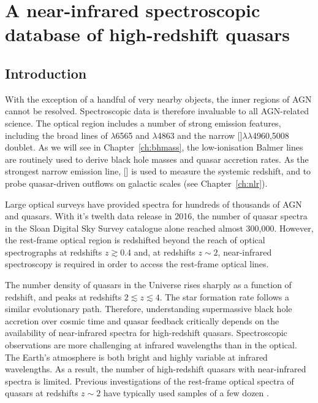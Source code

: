 
\chapter{A near-infrared spectroscopic database of high-redshift quasars}
\label{ch:chapter02}

\section{Introduction}

With the exception of a handful of very nearby objects, the inner regions of AGN cannot be resolved. 
Spectroscopic data is therefore invaluable to all AGN-related science. 
The optical region includes a number of strong emission features, including the broad lines of \hans$\lambda$6565 and \hbns$\lambda$4863 and the narrow []$\lambda\lambda$4960,5008 doublet. 
As we will see in Chapter~\ref{ch:bhmass}, the low-ionisation Balmer lines are routinely used to derive black hole masses and quasar accretion rates. 
As the strongest narrow emission line, [] is used to measure the systemic redshift, and to probe quasar-driven outflows on galactic scales (see Chapter~\ref{ch:nlr}). 

Large optical surveys have provided spectra for hundreds of thousands of AGN and quasars. 
With it's twelth data release in 2016, the number of quasar spectra in the Sloan Digital Sky Survey \citep[SDSS;][]{york00} catalogue alone reached almost 300,000. 
However, the rest-frame optical region is redshifted beyond the reach of optical spectrographs at redshifts $z \gtrsim$0.4 and, at redshifts $z\sim2$, near-infrared spectroscopy is required in order to access the rest-frame optical lines. 

The number density of quasars in the Universe rises sharply as a function of redshift, and peaks at redshifts $2\lesssim z \lesssim 4$. 
The star formation rate follows a similar evolutionary path. 
Therefore, understanding supermassive black hole accretion over cosmic time and quasar feedback critically depends on the availability of near-infrared spectra for high-redshift quasars. 
Spectroscopic observations are more challenging at infrared wavelengths than in the optical.
The Earth's atmosphere is both bright and highly variable at infrared wavelengths. 
As a result, the number of high-redshift quasars with near-infrared spectra is limited. 
Previous investigations of the rest-frame optical spectra of quasars at redshifts $z\sim2$ have typically used samples of a few dozen \citep[e.g.][]{shen12,shen16a}. 

